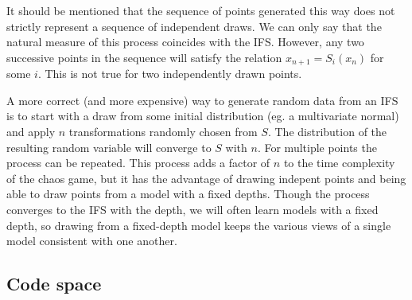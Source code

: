 \documentclass[10pt,a4paper,oneside]{article}
\theoremstyle{definition}
\begin{document}
It should be mentioned that the sequence of points generated this way does not strictly represent a sequence of independent draws. We can only say that the natural measure of this process coincides with the IFS. However, any two successive points in the sequence will satisfy the relation $x_{n+1} = S_i(x_{n})$ for some $i$. This is not true for two independently drawn points. 

A more correct (and more expensive) way to generate random data from an IFS is to start with a draw from some initial distribution (eg. a multivariate normal) and apply $n$ transformations randomly chosen from $S$. The distribution of the resulting random variable will converge to $S$ with $n$. For multiple points the process can be repeated. This process adds a factor of $n$ to the time complexity of the chaos game, but it has the advantage of drawing indepent points and being able to draw points from a model with a fixed depths. Though the process converges to the IFS with the depth, we will often learn models with a fixed depth, so drawing from a fixed-depth model keeps the various views of a single model consistent with one another. 

\subsection*{Code space}
\label{sec:code-space}
\end{document}
